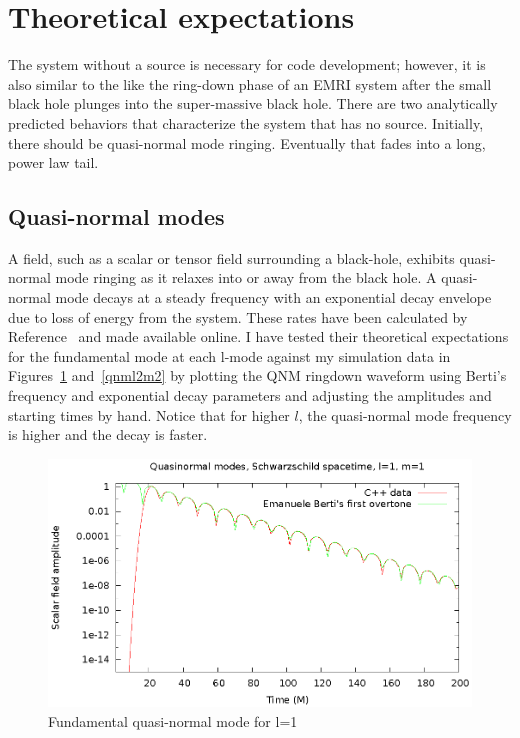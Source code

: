   



\section{Theoretical expectations}

The system without a source is necessary for code development; however, it is also similar to the like the ring-down phase of an EMRI system after the small black hole plunges into the super-massive black hole. There are two analytically predicted behaviors that characterize the system that has no source. Initially, there should be quasi-normal mode ringing. Eventually that fades into a long, power law tail. 

\subsection{Quasi-normal modes}
A field, such as a scalar or tensor field surrounding a black-hole, exhibits quasi-normal mode ringing as it relaxes into or away from the black hole. A quasi-normal mode decays at a steady frequency with an exponential decay envelope due to loss of energy from the system. These rates have been calculated by Reference~\cite{bertiSchwQNM} and made available online. I have tested their theoretical expectations for the fundamental mode at each l-mode against my simulation data in Figures~\ref{qnml1m1} and~\ref{qnml2m2} by plotting the QNM ringdown waveform using Berti's frequency and exponential decay parameters and adjusting the amplitudes and starting times by hand. Notice that for higher $l$, the quasi-normal mode frequency is higher and the decay is faster.

\begin{figure}
  \includegraphics{l1m1qnm}
  \caption{Fundamental quasi-normal mode for l=1}
  \label{qnml1m1}
\end{figure}

